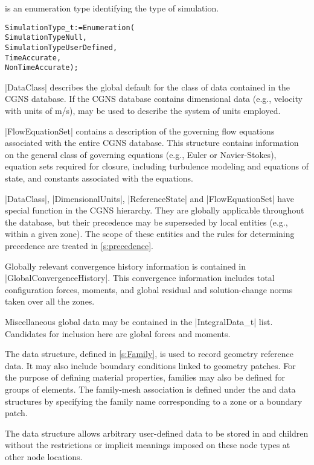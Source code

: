  is an enumeration type identifying the type
of simulation.

\begin{alltt}
  SimulationType\_t := Enumeration (
    SimulationTypeNull,
    SimulationTypeUserDefined,
    TimeAccurate,
    NonTimeAccurate ) ;
\end{alltt}

|DataClass| describes the global default for the class of data
contained in the CGNS database.
If the CGNS database contains dimensional data (e.g., velocity with units
of m/s),  may be used to describe the system of
units employed.

|FlowEquationSet| contains a description of the governing flow
equations associated with the entire CGNS database.  This structure contains
information on the general class of governing equations (e.g., Euler or
Navier-Stokes), equation sets required for closure, including turbulence
modeling and equations of state, and constants associated with the
equations.

|DataClass|, |DimensionalUnits|, |ReferenceState| and
|FlowEquationSet| have special function in the CGNS hierarchy.  They
are globally applicable throughout the database, but their precedence may
be superseded by local entities (e.g., within a given zone).  The scope of
these entities and the rules for determining precedence are treated in 
\autoref{s:precedence}.

Globally relevant convergence history information is contained in
|GlobalConvergenceHistory|.  This convergence information includes total
configuration forces, moments, and global residual and solution-change
norms taken over all the zones.

Miscellaneous global data may be contained in the |IntegralData_t| list.
Candidates for inclusion here are global forces and moments.

The  data structure, defined in \autoref{s:Family},
is used to record geometry reference data.
It may also include boundary conditions linked to geometry patches.
For the purpose of defining material properties, families may also be
defined for groups of elements.
The family-mesh association is defined under the  and
 data structures by specifying the family name corresponding
to a zone or a boundary patch.

The  data structure allows arbitrary
user-defined data to be stored in  and
 children without the restrictions or implicit
meanings imposed on these node types at other node locations.

